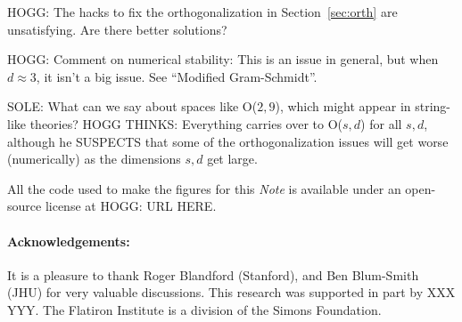 \documentclass{article}
\newcommand{\documentname}{\textsl{Note}}
\newcommand{\secref}[1]{Section~\ref{#1}}
\begin{document}
HOGG: The hacks to fix the orthogonalization in \secref{sec:orth} are unsatisfying. Are there better solutions?

HOGG: Comment on numerical stability: This is an issue in general, but when $d\approx 3$, it isn't a big issue. See ``Modified Gram-Schmidt''.

SOLE: What can we say about spaces like O($2,9$), which might appear in string-like theories?
HOGG THINKS: Everything carries over to O($s,d$) for all $s,d$, although he SUSPECTS that some of the orthogonalization issues will get worse (numerically) as the dimensions $s,d$ get large.

All the code used to make the figures for this \documentname{} is available under an open-source license at HOGG: URL HERE.

\paragraph{Acknowledgements:}
It is a pleasure to thank
  Roger Blandford (Stanford), and
  Ben Blum-Smith (JHU)
for very valuable discussions.
This research was supported in part by XXX YYY.
The Flatiron Institute is a division of the Simons Foundation.

\raggedright
\printbibliography
\end{document}
